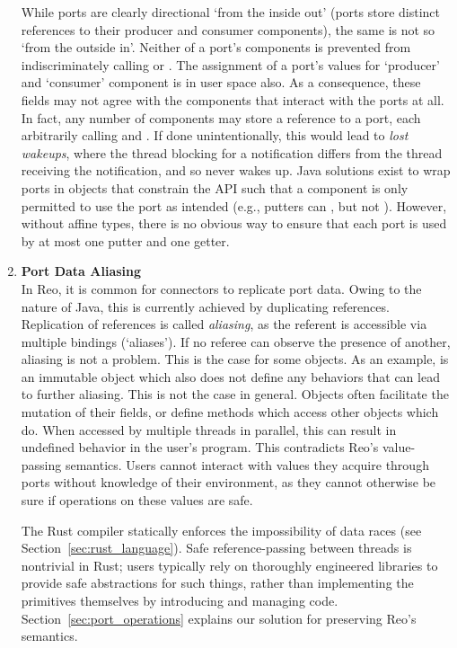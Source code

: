 \begin{enumerate}
	While ports are clearly directional `from the inside out' (ports store distinct references to their producer and consumer components), the same is not so `from the outside in'. Neither of a port's components is prevented from indiscriminately calling  or . The assignment of a port's values for `producer' and `consumer' component is in user space also. As a consequence, these fields may not agree with the components that interact with the ports at all. In fact, any number of components may store a reference to a port, each arbitrarily calling  and . If done unintentionally, this would lead to \textit{lost wakeups}, where the thread blocking for a notification differs from the thread receiving the notification, and so never wakes up. 
	Java solutions exist to wrap ports in objects that constrain the API such that a component is only permitted to use the port as intended (e.g., putters can , but not ). However, without affine types, there is no obvious way to ensure that each port is used by at most one putter and one getter. 
	
	\item \textbf{Port Data Aliasing}\\
	In Reo, it is common for connectors to replicate port data. Owing to the nature of Java, this is currently achieved by duplicating references. Replication of references is called \textit{aliasing}, as the referent is accessible via multiple bindings (`aliases'). If no referee can observe the presence of another, aliasing is not a problem. This is the case for some objects. As an example,  is an immutable object which also does not define any behaviors that can lead to further aliasing. This is not the case in general. Objects often facilitate the mutation of their fields, or define methods which access other objects which do. When accessed by multiple threads in parallel, this can result in undefined behavior in the user's program. This contradicts Reo's value-passing semantics. Users cannot interact with values they acquire through ports without knowledge of their environment, as they cannot otherwise be sure if operations on these values are safe.
	
	The Rust compiler statically enforces the impossibility of data races (see Section~\ref{sec:rust_language}). Safe reference-passing between threads is nontrivial in Rust; users typically rely on thoroughly engineered libraries to provide safe abstractions for such things, rather than implementing the primitives themselves by introducing and managing  code. Section~\ref{sec:port_operations} explains our solution for preserving Reo's semantics.
	

\end{enumerate}
